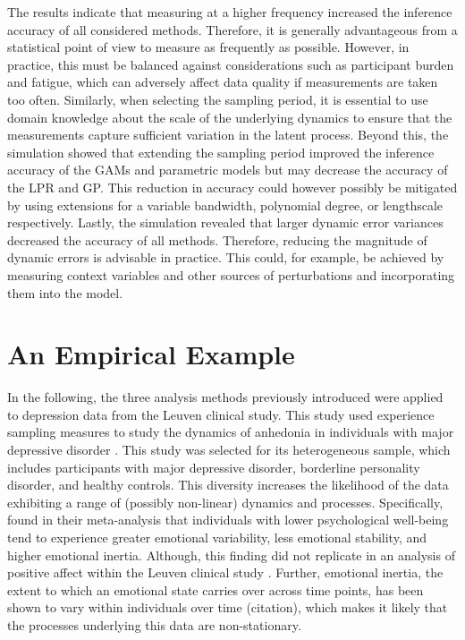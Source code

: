 \documentclass[man, floatsintext]{apa7}
\begin{document}
The results indicate that measuring at a higher frequency increased the
inference accuracy of all considered methods. Therefore, it is generally
advantageous from a statistical point of view to measure as frequently as
possible. However, in practice, this must be balanced against considerations
such as participant burden and fatigue, which can adversely affect data quality
if measurements are taken too often. Similarly, when selecting the sampling
period, it is essential to use domain knowledge about the scale of the
underlying dynamics to ensure that the measurements capture sufficient
variation in the latent process. Beyond this, the simulation showed that
extending the sampling period improved the inference accuracy of the GAMs and
parametric models but may decrease the accuracy of the LPR and GP\@. This
reduction in accuracy could however possibly be mitigated by using extensions
for a variable bandwidth, polynomial degree, or lengthscale respectively.
Lastly, the simulation revealed that larger dynamic error variances decreased
the accuracy of all methods. Therefore, reducing the magnitude of dynamic
errors is advisable in practice. This could, for example, be achieved by
measuring context variables and other sources of perturbations and
incorporating them into the model.

\section{An Empirical Example} \label{empirical_example}

In the following, the three analysis methods previously introduced were applied
to depression data from the Leuven clinical study. This study used experience
sampling measures to study the dynamics of anhedonia in individuals with major
depressive disorder \parencite{heininga_dynamical_2019}. This study was
selected for its heterogeneous sample, which includes participants with major
depressive disorder, borderline personality disorder, and healthy controls.
This diversity increases the likelihood of the data exhibiting a range of
(possibly non-linear) dynamics and processes. Specifically,
\textcite{houben_relation_2015} found in their meta-analysis that individuals
with lower psychological well-being tend to experience greater emotional
variability, less emotional stability, and higher emotional inertia. Although,
this finding did not replicate in an analysis of positive affect within the
Leuven clinical study \parencite{heininga_dynamical_2019}. Further, emotional
inertia, the extent to which an emotional state carries over across time
points, has been shown to vary within individuals over time (citation), which
makes it likely that the processes underlying this data are non-stationary.
\end{document}

